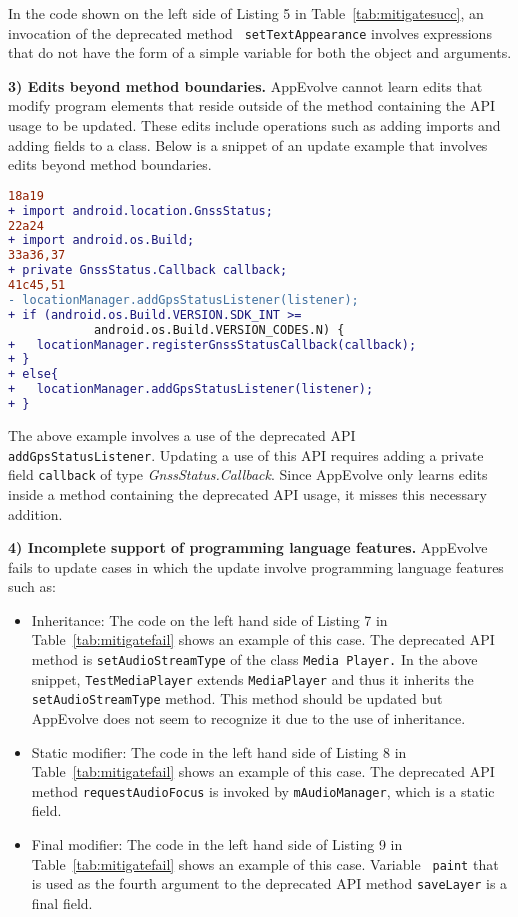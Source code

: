 In the code shown on the left side of Listing 5 in
Table~\ref{tab:mitigatesucc}, an invocation of the deprecated method {\tt
setTextAppearance} involves expressions that do not have the form
of a simple variable for both the object and arguments.

\vspace{0.25\baselineskip}\noindent\textbf{3) Edits beyond method boundaries.} AppEvolve cannot learn edits that modify program elements that reside outside of the method containing the API usage to be updated. These edits include operations such as adding imports and adding fields to a class. Below is a snippet of an update example that involves edits beyond method boundaries.
\begin{lstlisting}[language=diff,numbers=none]
18a19
+ import android.location.GnssStatus;
22a24
+ import android.os.Build;
33a36,37
+ private GnssStatus.Callback callback;
41c45,51
- locationManager.addGpsStatusListener(listener);
+ if (android.os.Build.VERSION.SDK_INT >=
            android.os.Build.VERSION_CODES.N) {
+   locationManager.registerGnssStatusCallback(callback);
+ }
+ else{
+   locationManager.addGpsStatusListener(listener);
+ }
\end{lstlisting}
The above example involves a use of the deprecated API {\tt
addGpsStatusListener}. Updating a use of this API requires adding a private
field {\tt callback} of type {\em GnssStatus.Callback}.
Since AppEvolve only learns edits inside a method containing the deprecated
API usage, it misses this necessary addition.

\vspace{0.25\baselineskip}\noindent\textbf{4) Incomplete support of programming language features.} AppEvolve fails to update cases in which the update involve programming language features such as:
\begin{itemize}
\item Inheritance: The code on the left hand side of Listing 7 in Table~\ref{tab:mitigatefail} shows an example of this case.  The deprecated API method is {\tt setAudioStreamType} of the class {\tt Media Player.} In the above snippet, {\tt TestMediaPlayer} extends {\tt MediaPlayer} and thus it inherits the {\tt setAudioStreamType} method. This method should be updated but AppEvolve does not seem to recognize it due to the use of inheritance.
\item Static modifier:  The code in the left hand side of Listing 8 in Table~\ref{tab:mitigatefail} shows an example of this case.  The deprecated API method {\tt requestAudioFocus} is invoked by {\tt mAudioManager}, which is a static field.

\item Final modifier: The code in the left hand side of Listing 9 in
Table~\ref{tab:mitigatefail} shows an example of this case.  Variable {\tt
paint} that is used as the fourth argument to the deprecated API method {\tt saveLayer} is a final field.

\end{itemize}

